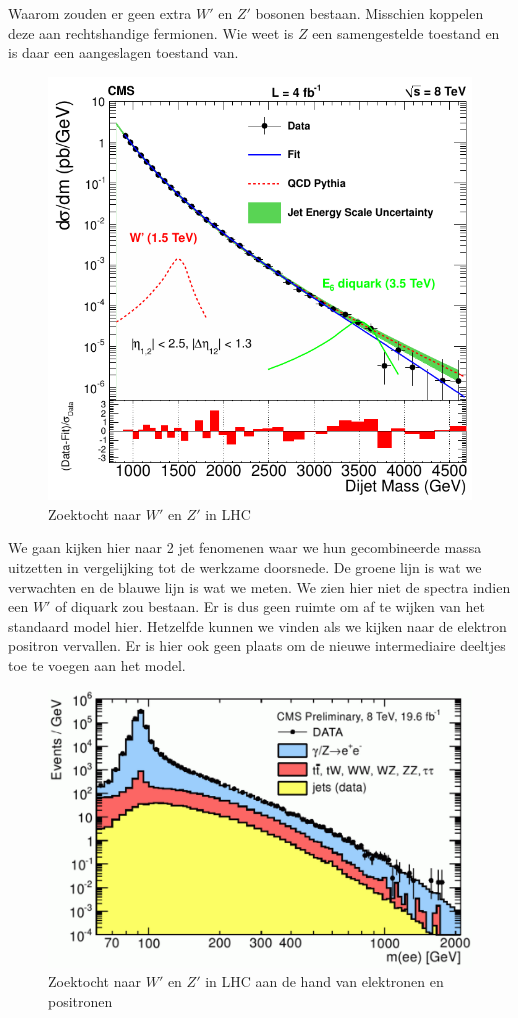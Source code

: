 \documentclass[../main.tex]{subfiles}
\begin{document}
Waarom zouden er geen extra $W'$ en $Z'$ bosonen bestaan. Misschien koppelen deze aan rechtshandige fermionen. Wie weet is $Z$ een samengestelde toestand en is daar een aangeslagen toestand van.

\begin{figure}[h]
    \centering
    \includegraphics[width=0.4\linewidth]{physics_beyond_the_standard_model/cms_w'_z'_zoektocht.png}
    \caption{Zoektocht naar $W'$ en $Z'$ in LHC}%
    \label{fig:physics_beyond_the_standard_model/cms_w'_z'_zoektocht}
\end{figure}

We gaan kijken hier naar 2 jet fenomenen waar we hun gecombineerde massa uitzetten in vergelijking tot de werkzame doorsnede. De groene lijn is wat we verwachten en de blauwe lijn is wat we meten. We zien hier niet de spectra indien een $W'$ of diquark zou bestaan. Er is dus geen ruimte om af te wijken van het standaard model hier. Hetzelfde kunnen we vinden als we kijken naar de elektron positron vervallen. Er is hier ook geen plaats om de nieuwe intermediaire deeltjes toe te voegen aan het model.

\begin{figure}[h]
    \centering
    \includegraphics[width=0.6\linewidth]{physics_beyond_the_standard_model/ee_w'_z'_zoektocht.png}
    \caption{Zoektocht naar $W'$ en $Z'$ in LHC aan de hand van elektronen en positronen}%
    \label{fig:physics_beyond_the_standard_model/ee_w'_z'_zoektocht}
\end{figure}
\end{document}
